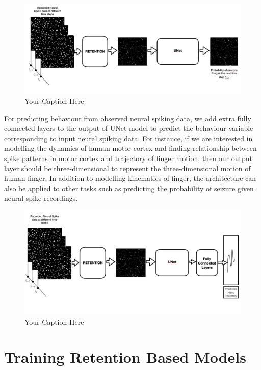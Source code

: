 \begin{figure}
  \centering
  \includegraphics[width=1.0\linewidth]{figures/retention_autoregressive.png}  
  \caption{Your Caption Here}
  \label{fig:your_label}  %
\end{figure}
For predicting behaviour from observed neural spiking data, we add extra fully connected layers to the output of UNet model to predict the behaviour variable corresponding to input neural spiking data. 
For instance, if we are interested in modelling the dynamics of human motor cortex and finding relationship between spike patterns in motor cortex and trajectory of finger motion, then our output layer should be three-dimensional to represent the three-dimensional motion of human finger. In addition to modelling kinematics of finger, the architecture can also be applied to other tasks such as predicting the probability of seizure given neural spike recordings. 


\begin{figure}
    \centering
    \includegraphics[width=1.0\linewidth]{figures/retention_spike_to_behavior.png}  
    \caption{Your Caption Here}
    \label{fig:your_label}  %
  \end{figure}

\section{Training Retention Based Models}

